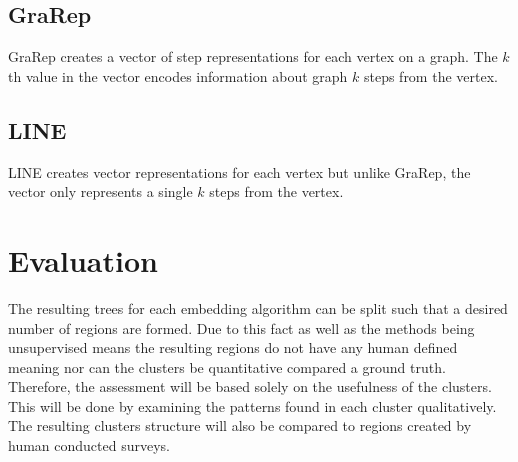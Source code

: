 \documentclass[journal,compsoc]{IEEEtran}
\begin{document}
\subsection{GraRep \cite{Cao2015GraRepLG}}
GraRep creates a vector of step representations for each vertex on a graph. The ${k}$th value in the vector encodes information about graph ${k}$ steps from the vertex.

\subsection{LINE \cite{Tang2015LINELI}}
LINE creates vector representations for each vertex but unlike GraRep, the vector only represents a single  ${k}$ steps from the vertex.


\section{Evaluation}
The resulting trees for each embedding algorithm can be split such that a desired number of regions are formed. Due to this fact as well as the methods being unsupervised means the resulting regions do not have any human defined meaning nor can the clusters be quantitative compared a ground truth. Therefore, the assessment will be based solely on the usefulness of the clusters. This will be done by examining the patterns found in each cluster qualitatively. The resulting clusters structure will also be compared to regions created by human conducted surveys.




\end{document}
